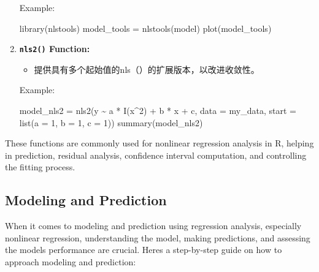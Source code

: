 \documentclass[
]{article}
\newenvironment{Shaded}{}{}
\newcommand{\AttributeTok}[1]{\textcolor[rgb]{0.49,0.56,0.16}{#1}}
\newcommand{\DecValTok}[1]{\textcolor[rgb]{0.25,0.63,0.44}{#1}}
\newcommand{\FunctionTok}[1]{\textcolor[rgb]{0.02,0.16,0.49}{#1}}
\newcommand{\NormalTok}[1]{#1}
\newcommand{\OtherTok}[1]{\textcolor[rgb]{0.00,0.44,0.13}{#1}}
\newcommand{\SpecialCharTok}[1]{\textcolor[rgb]{0.25,0.44,0.63}{#1}}
\begin{document}
\begin{enumerate}
  Example:

\begin{Shaded}
\begin{Highlighting}[]
\FunctionTok{library}\NormalTok{(nlstools)}
\NormalTok{model\_tools }\OtherTok{=} \FunctionTok{nlstools}\NormalTok{(model)}
\FunctionTok{plot}\NormalTok{(model\_tools)}
\end{Highlighting}
\end{Shaded}
\item
  \textbf{\texttt{nls2()} Function:}

  \begin{itemize}
  \item
    提供具有多个起始值的\textquotesingle nls（）\textquotesingle 的扩展版本，以改进收敛性。
  \end{itemize}

  Example:

\begin{Shaded}
\begin{Highlighting}[]
\NormalTok{model\_nls2 }\OtherTok{=} \FunctionTok{nls2}\NormalTok{(y }\SpecialCharTok{\textasciitilde{}}\NormalTok{ a }\SpecialCharTok{*} \FunctionTok{I}\NormalTok{(x}\SpecialCharTok{\^{}}\DecValTok{2}\NormalTok{) }\SpecialCharTok{+}\NormalTok{ b }\SpecialCharTok{*}\NormalTok{ x }\SpecialCharTok{+}\NormalTok{ c, }\AttributeTok{data =}\NormalTok{ my\_data, }\AttributeTok{start =} \FunctionTok{list}\NormalTok{(}\AttributeTok{a =} \DecValTok{1}\NormalTok{, }\AttributeTok{b =} \DecValTok{1}\NormalTok{, }\AttributeTok{c =} \DecValTok{1}\NormalTok{))}
\FunctionTok{summary}\NormalTok{(model\_nls2)}
\end{Highlighting}
\end{Shaded}
\end{enumerate}

These functions are commonly used for nonlinear regression analysis in
R, helping in prediction, residual analysis, confidence interval
computation, and controlling the fitting process.

\hypertarget{modeling-and-prediction}{%
\subsection{Modeling and Prediction}\label{modeling-and-prediction}}

When it comes to modeling and prediction using regression analysis,
especially nonlinear regression, understanding the model, making
predictions, and assessing the model\textquotesingle s performance are
crucial. Here\textquotesingle s a step-by-step guide on how to approach
modeling and prediction:
\end{document}
